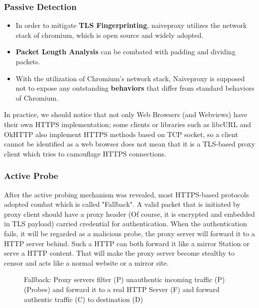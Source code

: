 \documentclass[conference]{IEEEtran}
\begin{document}
\subsubsection{Passive Detection}
\begin{itemize}
    \item In order to mitigate \textbf{TLS Fingerprinting}, naiveproxy utilizes the network stack of chromium, which is open source and widely adopted.
    \item \textbf{Packet Length Analysis} can be combated with padding and dividing packets.
    \item  With the utilization of Chromium's network stack, Naiveproxy is supposed not to expose any outstanding \textbf{behaviors} that differ from standard behaviors of Chromium.
\end{itemize}

In practice, we should notice that not only Web Browsers (and Webviews) have their own HTTPS implementation; some clients or libraries such as libcURL and OkHTTP also implement HTTPS methods based on TCP socket, so a client cannot be identified as a web browser does not mean that it is a TLS-based proxy client which tries to camouflage HTTPS connections.


\subsubsection{Active Probe}
After the active probing mechanism was revealed, most HTTPS-based protocols adopted combat which is called "Fallback". A valid packet that is initiated by proxy client should have a proxy header (Of course, it is encrypted and embedded in TLS payload) carried credential for authentication. When the authentication fails, it will be regarded as a malicious probe, the proxy server will forward it to a HTTP server behind. Such a HTTP can both forward it like a mirror Station or serve a HTTP content. That will make the proxy server become stealthy to censor and acts like a normal website or a mirror site.

\begin{figure}[!h]
    \centering
    
    \caption{Fallback: Proxy servers filter (P) unauthentic incoming traffic (P) (Probes) and forward it to a real HTTP Server (F) and forward authentic traffic (C) to destination (D)}
    \label{fig:fallback}
\end{figure}
\end{document}
